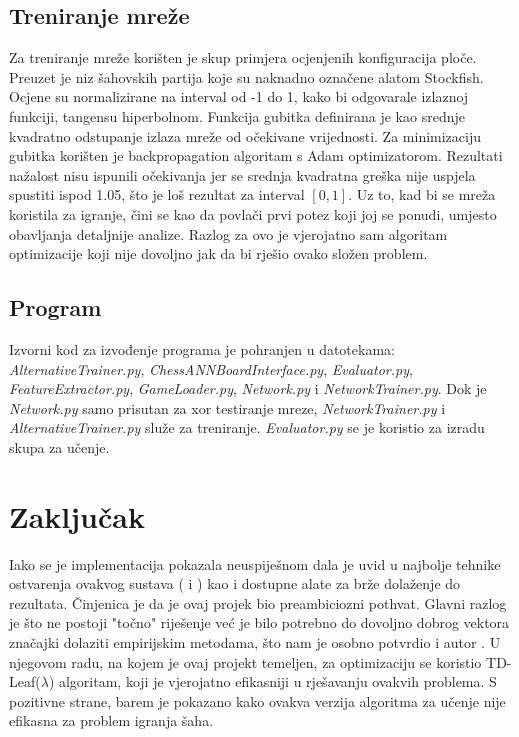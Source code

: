 \documentclass[journal]{IEEEtran}
\begin{document}
\subsection{Treniranje mreže}
Za treniranje mreže korišten je skup primjera ocjenjenih konfiguracija ploče. Preuzet je niz šahovskih partija koje su naknadno označene alatom Stockfish. Ocjene su normalizirane na interval od -1 do 1, kako bi odgovarale izlaznoj funkciji, tangensu hiperbolnom. Funkcija gubitka definirana je kao srednje kvadratno odstupanje izlaza mreže od očekivane vrijednosti. Za minimizaciju gubitka korišten je backpropagation algoritam s Adam optimizatorom. Rezultati nažalost nisu ispunili očekivanja jer se srednja kvadratna greška nije uspjela spustiti ispod 1.05, što je loš rezultat za interval  $\left[0,1\right]$. Uz to, kad bi se mreža koristila za igranje, čini se kao da povlači prvi potez koji joj se ponudi, umjesto obavljanja detaljnije analize. Razlog za ovo je vjerojatno sam algoritam optimizacije koji nije dovoljno jak da bi rješio ovako složen problem.


\subsection{Program}
Izvorni kod za izvođenje programa je pohranjen u datotekama: \textit{AlternativeTrainer.py}, \textit{ChessANNBoardInterface.py}, \textit{Evaluator.py}, \textit{FeatureExtractor.py}, \textit{GameLoader.py}, \textit{Network.py} i \textit{NetworkTrainer.py}. Dok je \textit{Network.py} samo prisutan za xor testiranje mreze, \textit{NetworkTrainer.py} i \textit{AlternativeTrainer.py} služe za treniranje. \textit{Evaluator.py} se je koristio za izradu skupa za učenje.



\section{Zaključak}
Iako se je implementacija pokazala neuspiješnom dala je uvid u najbolje tehnike ostvarenja ovakvog sustava (\cite{giraffe} i \cite{dpchess}) kao i dostupne alate za brže dolaženje do rezultata. Činjenica je da je ovaj projek bio preambiciozni pothvat. Glavni razlog je što ne postoji "točno" riješenje već je bilo potrebno do dovoljno dobrog vektora značajki dolaziti empirijskim metodama, što nam je osobno potvrdio i autor \cite{giraffe}. U njegovom radu, na kojem je ovaj projekt temeljen, za optimizaciju se koristio TD-Leaf($\lambda$) algoritam, koji je vjerojatno efikasniji u rješavanju ovakvih problema. S pozitivne strane, barem je pokazano kako ovakva verzija algoritma za učenje nije efikasna za problem igranja šaha.

\ifCLASSOPTIONcaptionsoff
  \newpage
\fi



\end{document}
